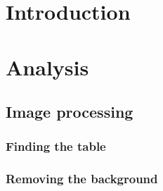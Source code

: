 
\usepackage{float}
\usepackage{graphicx}







\tableofcontents

\chapter{Introduction}

\chapter{Analysis}
	
\section{Image processing}
	\subsection{Finding the table}
		

	\subsection{Removing the background}
		




